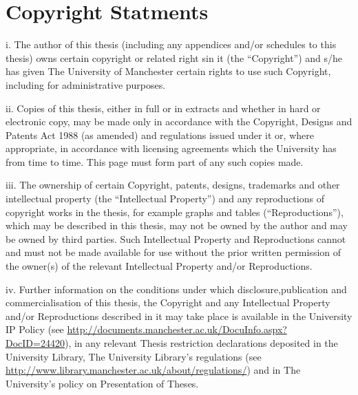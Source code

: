 \chapter*{Copyright Statments}
\begin{list}{label}{}
	\item[i.] The author of this thesis (including any appendices and/or schedules to this thesis) owns certain copyright or related right sin it (the “Copyright”) and s/he has given The University of Manchester certain rights to use such Copyright, including for administrative purposes.
	
	\item[ii.] Copies of this thesis, either in full or in extracts and whether in hard or electronic copy, may be made only in accordance with the Copyright, Designs and Patents Act 1988 (as amended) and regulations issued under it or, where appropriate, in accordance with licensing agreements which the University has from time to time. This page must form part of any such copies made.
	
	\item[iii.] The ownership of certain Copyright, patents, designs, trademarks and other intellectual property (the “Intellectual Property”) and any reproductions of copyright works in the thesis, for example graphs and tables (“Reproductions”), which may be described in this thesis, may not be owned by the author and may be owned by third parties. Such Intellectual Property and Reproductions cannot and must not be made available for use without the prior written permission of the owner(s) of the relevant Intellectual Property and/or Reproductions.
	
	\item[iv.] Further information on the conditions under which disclosure,publication and commercialisation of this thesis, the Copyright and any Intellectual Property and/or Reproductions described in it may take place is available in the University IP Policy (see \url{http://documents.manchester.ac.uk/DocuInfo.aspx?DocID=24420}), in any relevant Thesis restriction declarations deposited in the University Library, The University Library’s regulations (see \url{http://www.library.manchester.ac.uk/about/regulations/}) and in The University’s policy on Presentation of Theses.
\end{list}
